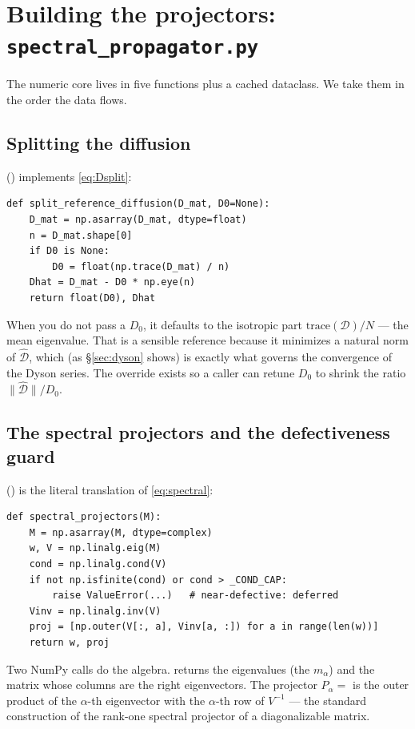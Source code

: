 \section{Building the projectors: \texttt{spectral\_propagator.py}}

The numeric core lives in five functions plus a cached dataclass. We take them
in the order the data flows.

\subsection{Splitting the diffusion}

() implements \eqref{eq:Dsplit}:

\begin{lstlisting}
def split_reference_diffusion(D_mat, D0=None):
    D_mat = np.asarray(D_mat, dtype=float)
    n = D_mat.shape[0]
    if D0 is None:
        D0 = float(np.trace(D_mat) / n)
    Dhat = D_mat - D0 * np.eye(n)
    return float(D0), Dhat
\end{lstlisting}

When you do not pass a $D_{0}$, it defaults to the isotropic part
$\mathrm{trace}(\mathcal{D})/N$ --- the mean eigenvalue. That is a sensible
reference because it minimizes a natural norm of $\widehat{\mathcal{D}}$, which
(as \S\ref{sec:dyson} shows) is exactly what governs the convergence of the
Dyson series. The override exists so a caller can retune $D_{0}$ to shrink the
ratio $\lVert\widehat{\mathcal{D}}\rVert/D_{0}$.

\subsection{The spectral projectors and the defectiveness guard}

 () is the
literal translation of \eqref{eq:spectral}:

\begin{lstlisting}
def spectral_projectors(M):
    M = np.asarray(M, dtype=complex)
    w, V = np.linalg.eig(M)
    cond = np.linalg.cond(V)
    if not np.isfinite(cond) or cond > _COND_CAP:
        raise ValueError(...)   # near-defective: deferred
    Vinv = np.linalg.inv(V)
    proj = [np.outer(V[:, a], Vinv[a, :]) for a in range(len(w))]
    return w, proj
\end{lstlisting}

Two NumPy calls do the algebra.  returns the eigenvalues
 (the $m_{\alpha}$) and the matrix  whose columns are the right
eigenvectors. The projector $P_{\alpha}=$  is
the outer product of the $\alpha$-th eigenvector with the $\alpha$-th row of
$V^{-1}$ --- the standard construction of the rank-one spectral projector of a
diagonalizable matrix.

